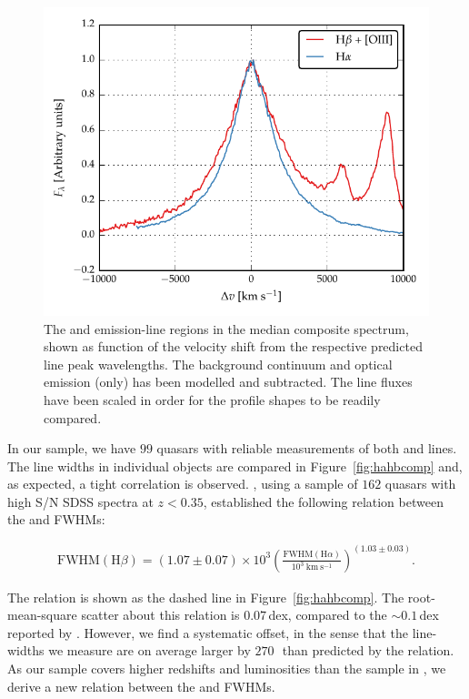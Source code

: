 \begin{figure}
    \centering 
    \includegraphics[width=0.8\linewidth]{figures/chapter03/ha_hb_composite.pdf} 
    \caption[{The \ha and \hb emission-line regions in the median composite spectrum.}]{The \ha and \hb emission-line regions in the median composite spectrum, shown as function of the velocity shift from the respective predicted line peak wavelengths. The background continuum and optical  emission (\hb only) has been modelled and subtracted. The line fluxes have been scaled in order for the profile shapes to be readily compared.}
    \label{fig:balmer_composite}
\end{figure}

In our sample, we have $99$ quasars with reliable measurements of both \ha and \hb lines. 
The line widths in individual objects are compared in Figure~\ref{fig:hahbcomp} and, as expected, a tight correlation is observed.  
\citet{greene05b}, using a sample of $162$ quasars with high S/N SDSS spectra at $z < 0.35$, established the following relation between the \ha and \hb FWHMs:

\begingroup\makeatletter{}\check@mathfonts
\begin{eqnarray}
  \text{FWHM}(\text{H}\beta) = \left( 1.07 \pm 0.07 \right) \times 10^3 \left( \frac{ \text{FWHM}(\text{H}\alpha) }{10^3 ~\text{km}~\text{s}^{-1} } \right)^{(1.03 \pm 0.03)}.
\end{eqnarray}
\endgroup

\noindent The relation is shown as the dashed line in Figure~\ref{fig:hahbcomp}.
The root-mean-square scatter about this relation is $0.07$\,dex, compared to the $\sim0.1$\,dex reported by \citet{greene05b}. 
However, we find a systematic offset, in the sense that the \hb line-widths we measure are on average larger by $270$\,\kms\, than predicted by the \citet{greene05b} relation. 
As our sample covers higher redshifts and luminosities than the sample in \citet{greene05b}, we derive a new relation between the \ha and \hb FWHMs.       

